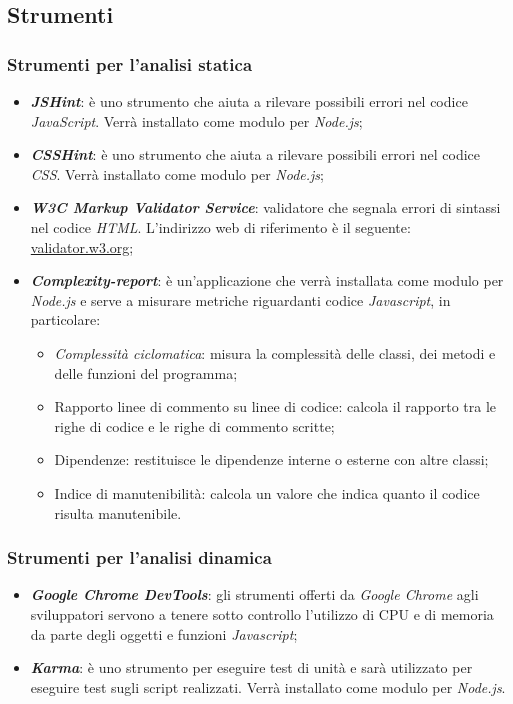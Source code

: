\subsection{Strumenti}
\subsubsection{Strumenti per l'analisi statica}
\begin{itemize}
  \item \textit{\textbf{JSHint}}: è uno strumento che aiuta a rilevare possibili 
  errori nel codice \textit{JavaScript}. Verrà installato come modulo per 
  \textit{Node.js};
  \item \textit{\textbf{CSSHint}}: è uno strumento che aiuta a rilevare possibili 
  errori nel codice \textit{CSS}. Verrà installato come modulo per 
  \textit{Node.js};
  \item \textit{\textbf{W3C Markup Validator Service}}: validatore che segnala 
  errori di sintassi nel codice \textit{HTML}. L'indirizzo web di riferimento è 
  il seguente: \href{validator.w3.org/}{validator.w3.org};
  \item \textit{\textbf{Complexity-report}}: è un'applicazione che verrà installata come modulo per 
  \textit{Node.js} e serve a misurare metriche riguardanti codice \textit{Javascript}, in particolare:
  \begin{itemize}
    \item \textit{Complessità ciclomatica}: misura la complessità delle classi, dei metodi e delle funzioni del programma;
    \item Rapporto linee di commento su linee di codice: calcola il rapporto tra 
    le righe di codice e le righe di commento scritte;
    \item Dipendenze: restituisce le dipendenze interne o esterne con altre 
    classi;
    \item Indice di manutenibilità: calcola un valore che indica quanto il 
    codice risulta manutenibile.
  \end{itemize}
\end{itemize}
\subsubsection{Strumenti per l'analisi dinamica}
\begin{itemize}
  \item \textit{\textbf{Google Chrome DevTools}}: gli strumenti offerti da \textit{Google Chrome} agli sviluppatori servono a tenere sotto controllo l'utilizzo 
  di CPU e di memoria da parte degli oggetti e funzioni \textit{Javascript};
  \item \textit{\textbf{Karma}}: è uno strumento per eseguire test di unità e sarà utilizzato per eseguire test
  sugli script realizzati. Verrà installato come modulo per \textit{Node.js}.
\end{itemize}


